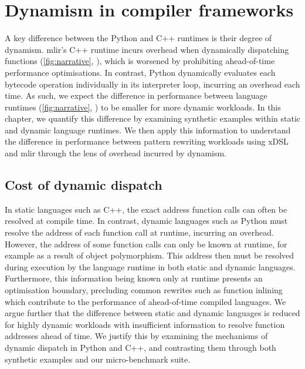 \chapter{Dynamism in compiler frameworks}
\label{chap:dynamism-pattern-rewriting}

A key difference between the Python and C++ runtimes is their degree of dynamism.
\ac{mlir}'s C++ runtime incurs overhead when dynamically dispatching functions (\autoref{fig:narrative}, ), which is worsened by prohibiting ahead-of-time performance optimisations.
In contrast, Python dynamically evaluates each bytecode operation individually in its interpreter loop, incurring an overhead each time. %
As such, we expect the difference in performance between language runtimes (\autoref{fig:narrative}, ) to be smaller for more dynamic workloads.
In this chapter, we quantify this difference by examining synthetic examples within static and dynamic language runtimes. We then apply this information to understand the difference in performance between pattern rewriting workloads using xDSL and \ac{mlir} through the lens of overhead incurred by dynamism.


\section{Cost of dynamic dispatch}
\label{sec:dynamism-pattern-rewriting-dispatch}

In static languages such as C++, the exact address function calls can often be resolved at compile time. In contrast, dynamic languages such as Python must resolve the address of each function call at runtime, incurring an overhead.
However, the address of some function calls can only be known at runtime, for example as a result of object polymorphism. This address then must be resolved during execution by the language runtime in both static and dynamic languages. Furthermore, this information being known only at runtime presents an optimisation boundary, precluding common rewrites such as function inlining which contribute to the performance of ahead-of-time compiled languages.
We argue further that the difference between static and dynamic languages is reduced for highly dynamic workloads with insufficient information to resolve function addresses ahead of time.
We justify this by examining the mechanisms of dynamic dispatch in Python and C++, and contrasting them through both synthetic examples and our micro-benchmark suite.

